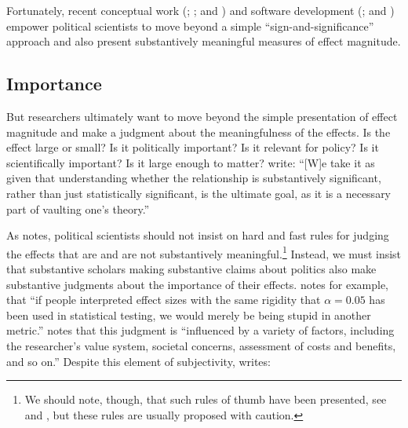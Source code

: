 \documentclass[12pt]{article}
\begin{document}

Fortunately, recent conceptual work (\citealt{KingTomzWittenberg2000}; \citealt{BerryDeMerittEsarey2010}; and \citealt{HanmerKalkan2013}) and software development (\citealt{TomzWittenbergKing2003}; and \citealt{ImaiKingLau2007}) empower political scientists to move beyond a simple ``sign-and-significance'' approach and also present substantively meaningful measures of effect magnitude.

\subsection*{Importance}

But researchers ultimately want to move beyond the simple presentation of effect magnitude and make a judgment about the meaningfulness of the effects. Is the effect large or small? Is it politically important? Is it relevant for policy? Is it scientifically important? Is it large enough to matter? \citet[p. 264]{HanmerKalkan2013} write: ``[W]e take it as given that understanding whether the relationship is substantively significant, rather than just statistically significant, is the ultimate goal, as it is a necessary part of vaulting one's theory.''

As \cite{Rainey2014a} notes, political scientists should not insist on hard and fast rules for judging the effects that are and are not substantively meaningful.\footnote{We should note, though, that such rules of thumb have been presented, see \cite{Glass1976} and \cite{Cohen1992}, but these rules are usually proposed with caution.} Instead, we must insist that substantive scholars making substantive claims about politics also make substantive judgments about the importance of their effects. \citet[pp. 82-83]{Thompson2001} notes for example, that ``if people interpreted effect sizes with the same rigidity that $\alpha = 0.05$ has been used in statistical testing, we would merely be being stupid in another metric.'' \cite{Kirk1996} notes that this judgment is ``influenced by a variety of factors, including the researcher's value system, societal concerns, assessment of costs and benefits, and so on.'' Despite this element of subjectivity, \citet[p. 30]{Thompson2002} writes: 
\end{document}
